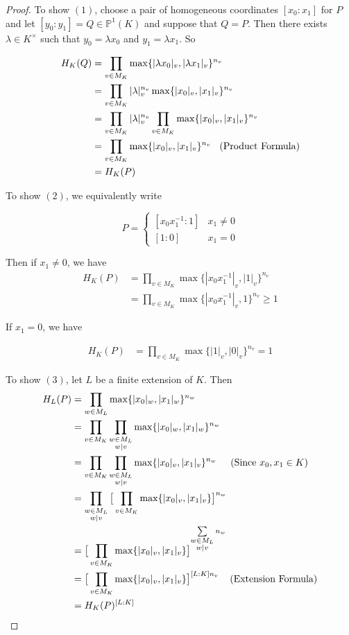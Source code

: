\documentclass[12pt]{amsart}
\theoremstyle{definition}
\theoremstyle{remark}
\theoremstyle{definition}
\renewcommand{\P}{\mathbb{P}}
\begin{document}
\begin{proof}
To show $(1)$, choose a pair of homogeneous coordinates $[x_0:x_1]$ for $P$ and let $[y_0:y_1] = Q \in \P^1(K)$ and suppose that $Q=P$. Then there exists $\lambda \in K^{\times}$ such that $y_0 = \lambda x_0$ and $y_1 = \lambda x_1$. So
 
\begin{align*}
H_K(Q) &= \prod_{v \in M_K}\max\{|\lambda x_0|_{v}, | \lambda x_1|_{v}\}^{n_{v}} \\
&= \prod_{v \in M_K}|\lambda |_{v}^{n_{v}} \max\{|x_0|_{v}, |x_1|_{v}\}^{n_{v}}\\
&= \prod_{v \in M_K}|\lambda |_{v}^{n_{v}} \prod_{v \in M_K}\max\{|x_0|_{v}, |x_1|_{v}\}^{n_{v}}\\
&= \prod_{v \in M_K}\max\{|x_0|_{v}, |x_1|_{v}\}^{n_{v}} \hspace{3mm} \text{(Product Formula)}\\
&= H_K(P)
\end{align*}

To show $(2)$, we equivalently write 

\[ P = \begin{cases} 
     [x_0x_1^{-1}:1] & x_1 \neq 0 \\
      [1:0] & x_1 = 0
   \end{cases}
\]

Then if $x_1 \neq 0$, we have 
\begin{align*}
H_K(P) 
&= \prod_{v \in M_K}\max\{|x_0x_1^{-1}|_v, |1|_v\}^{n_v}\\
&= \prod_{v \in M_K}\max\{|x_0x_1^{-1}|_v, 1\}^{n_v} \geq 1
\end{align*}  

If $x_1 = 0$, we have 

\begin{align*}
H_K(P) 
&= \prod_{v \in M_K}\max\{|1|_v, |0|_v\}^{n_v} =1
\end{align*}

To show $(3)$, let $L$ be a finite extension of $K$. 
Then 
\begin{align*}
H_L(P) 
&= \prod_{w \in M_L}\max\{|x_0|_w, |x_1|_w\}^{n_w}\\
&=\prod_{v \in M_K} \prod_{\substack{w \in M_L\\ w|v}}\max\{|x_0|_w, |x_1|_w\}^{n_w} \\
&=\prod_{v \in M_K} \prod_{\substack{w \in M_L\\ w|v}}\max\{|x_0|_v, |x_1|_v\}^{n_w} \hspace{5mm} (\text{Since } x_0, x_1 \in K)\\
&= \prod_{\substack{w \in M_L\\ w|v}}\big[ \prod_{v \in M_K}\max\{|x_0|_v, |x_1|_v\}\big]^{n_w}\\
&= \big[\prod_{v \in M_K} \max \{|x_0|_v, |x_1|_v\}\big]^{\sum\limits_{\substack{w\in M_L \\ w|v}}n_w}\\
&= \big[\prod_{v \in M_K} \max \{|x_0|_v, |x_1|_v\}\big]^{[L:K]n_v} \hspace{4mm} (\text{Extension Formula})\\ &= H_K(P)^{[L:K]}
\end{align*}
\end{proof}
\end{document}
